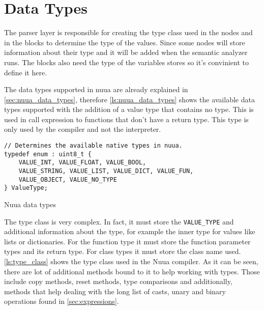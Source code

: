 \section{Data Types}

The parser layer is responsible for creating the type class used in the nodes and in the blocks to determine the type of the values.
Since some nodes will store information about their type and it will be added when the semantic analyzer runs. The blocks also need
the type of the variables stores so it's convinient to define it here.

The data types supported in nuua are already explained in \autoref{sec:nuua_data_types}, therefore \autoref{ls:nuua_data_types} shows the
available data types supported with the addition of a value type that contains no type. This is used in call expression to functions that don't have
a return type. This type is only used by the compiler and not the interpreter.

\begin{listing}[H]
\begin{verbatim}
// Determines the available native types in nuua.
typedef enum : uint8_t {
    VALUE_INT, VALUE_FLOAT, VALUE_BOOL,
    VALUE_STRING, VALUE_LIST, VALUE_DICT, VALUE_FUN,
    VALUE_OBJECT, VALUE_NO_TYPE
} ValueType;
\end{verbatim}
\caption{Nuua data types}
\label{ls:nuua_data_types}
\end{listing}

The type class is very complex. In fact, it must store the \texttt{VALUE\_TYPE} and additional information about the type, for example
the inner type for values like lists or dictionaries. For the function type it must store the function parameter types and its return type. For class types
it must store the class name used. \autoref{ls:type_class} shows the type class used in the Nuua compiler. As it can be seen, there are lot
of additional methods bound to it to help working with types. Those include copy methods, reset methods, type comparisons and additionally,
methods that help dealing with the long list of casts, unary and binary operations found in \autoref{sec:expressions}.

